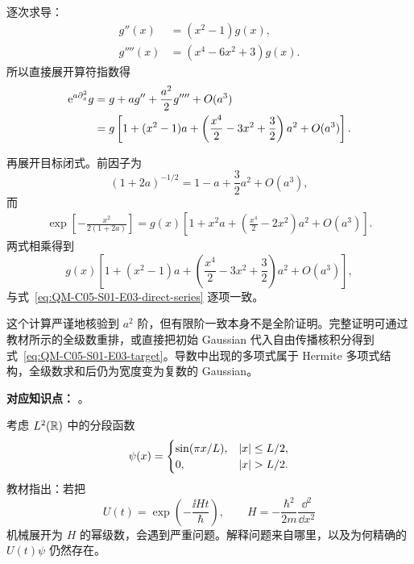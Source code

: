 \begin{checkedsolution}
逐次求导：
\begin{align}
  g''(x)&=(x^2-1)g(x),
  \label{eq:QM-C05-S01-E03-second-derivative}\\
  g''''(x)&=(x^4-6x^2+3)g(x).
  \label{eq:QM-C05-S01-E03-fourth-derivative}
\end{align}
所以直接展开算符指数得
\begin{align}
  \mathrm{e}^{a\partial_x^2}g
  &=g+ag''+\frac{a^2}{2}g''''+O(a^3)
  \notag\\
  &=g\left[
  1+(x^2-1)a
  +\left(\frac{x^4}{2}-3x^2+\frac32\right)a^2
  +O(a^3)\right].
  \label{eq:QM-C05-S01-E03-direct-series}
\end{align}

再展开目标闭式。前因子为
\begin{equation}
  (1+2a)^{-1/2}=1-a+\frac32a^2+O(a^3),
  \label{eq:QM-C05-S01-E03-prefactor-series}
\end{equation}
而
\begin{align}
  \exp\left[-\frac{x^2}{2(1+2a)}\right]
  =g(x)\left[
  1+x^2a+\left(\frac{x^4}{2}-2x^2\right)a^2
  +O(a^3)\right].
  \label{eq:QM-C05-S01-E03-exponent-series}
\end{align}
两式相乘得到
\begin{equation}
  g(x)\left[
  1+(x^2-1)a
  +\left(\frac{x^4}{2}-3x^2+\frac32\right)a^2
  +O(a^3)\right],
  \label{eq:QM-C05-S01-E03-closed-series}
\end{equation}
与式~\eqref{eq:QM-C05-S01-E03-direct-series} 逐项一致。

这个计算严谨地核验到 $a^2$ 阶，但有限阶一致本身不是全阶证明。完整证明可通过教材所示的全级数重排，或直接把初始 Gaussian 代入自由传播核积分得到式~\eqref{eq:QM-C05-S01-E03-target}。导数中出现的多项式属于 Hermite 多项式结构，全级数求和后仍为宽度变为复数的 Gaussian。
\end{checkedsolution}


\textbf{对应知识点：}
。

考虑 $L^2(\mathbb{R})$ 中的分段函数
\begin{equation}
  \psi(x)=
  \begin{cases}
    \sin(\pi x/L),&\abs x\leq L/2,\\
    0,&\abs x>L/2.
  \end{cases}
  \label{eq:QM-C05-S01-E04-state}
\end{equation}
教材指出：若把
\begin{equation}
  U(t)=\exp\left(-\frac{\ii Ht}{\hbar}\right),
  \qquad H=-\frac{\hbar^2}{2m}\frac{\dd^2}{\dd x^2}
  \label{eq:QM-C05-S01-E04-formal-evolution}
\end{equation}
机械展开为 $H$ 的幂级数，会遇到严重问题。解释问题来自哪里，以及为何精确的 $U(t)\psi$ 仍然存在。

